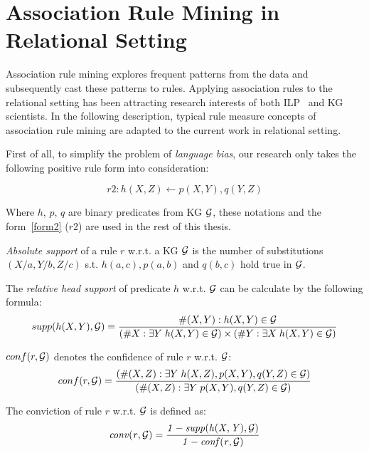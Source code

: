 \section{Association Rule Mining in Relational Setting}

Association rule mining explores frequent patterns from the data and subsequently cast these patterns to rules. Applying association rules to the relational setting has been attracting research interests of both ILP~\cite{ref52} and KG~\cite{ref10} scientists. In the following description, typical rule measure concepts of association rule mining are adapted to the current work in relational setting.

First of all, to simplify the problem of \textit{language bias}, our research only takes the following positive rule form into consideration:

\begin{equation}
r2: h(X, Z) \leftarrow p(X, Y), q(Y, Z)
\label{form2}
\end{equation}

Where $h$, $p$, $q$ are binary predicates from KG $\mathcal{G}$, these notations and the form~\ref{form2} ($r2$) are used in the rest of this thesis.

\begin{definition}
\textit{Absolute support} of a rule $r$ w.r.t. a KG $\mathcal{G}$ is the number of substitutions $(X/a, Y/b, Z/c)$ s.t. $h(a, c), p(a, b)$ and $q(b, c)$ hold true in $\mathcal{G}$.
\end{definition}

\begin{definition}
The \textit{relative head support} of predicate $h$ w.r.t. $\mathcal{G}$ can be calculate by the following formula:
\begin{equation}
supp(h(X,Y),\mathcal{G})=\dfrac{\#(X,Y):h(X,Y)\in \mathcal{G}}{(\#X:\exists Y\;h(X,Y)\in \mathcal{G})\times(\#Y:\exists X\;h(X,Y)\in \mathcal{G})}
\end{equation}
\end{definition}

\begin{definition}
$conf(r,\mathcal{G})$ denotes the confidence of rule $r$ w.r.t. $\mathcal{G}$:
\begin{equation}
conf(r,\mathcal{G})=\dfrac{(\#(X, Z):\exists Y\;h(X,Z),p(X,Y),q(Y,Z)\in \mathcal{G})}{(\#(X,Z):\exists Y\;p(X,Y),q(Y,Z)\in \mathcal{G})}
\end{equation}
\end{definition}

\begin{definition}
The conviction of rule $r$ w.r.t. $\mathcal{G}$ is defined as:
\begin{equation}
\mathit{conv(r, \mathcal{G})= \dfrac{1 - supp(h(X,Y), \mathcal{G})}{1 - conf(r, \mathcal{G})}}
\end{equation}
\end{definition}

